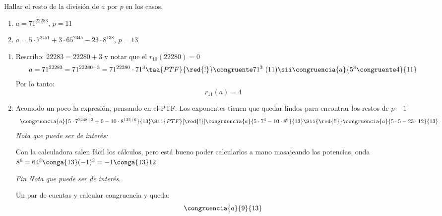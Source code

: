 \begin{enunciado}{\ejercicio}
  Hallar el resto de la división de $a$ por $p$ en los casos.
  \begin{enumerate}[label=\alph*)]
    \item $a = 71^{22283},\, p=11$
    \item $a = 5 \cdot 7^{2451} + 3 \cdot 65^{2345} - 23 \cdot 8^{138}, \, p = 13$
  \end{enumerate}
\end{enunciado}

\begin{enumerate}[label=\alph*)]
  \item
        Rescribo: $22283 = 22280 + 3$ y notar que el $r_{10}(22280) = 0$
        $$
          a = 71^{22283} =
          71^{22280 + 3} =
          71^{22280} \cdot 71^3
          \taa{PTF}{\red{!}}\congruente 71^3 \ (11) \sii \congruencia{a}{5^3 \congruente 4}{11}
        $$
        Por lo tanto:
        $$
          r_{11}(a) = 4
        $$

  \item
        Acomodo un poco la expresión, pensando en el PTF. Los exponentes tienen que quedar lindos para encontrar los restos de $p-1$
        $$
          \begin{array}{l}
            \congruencia{a}{5 \cdot 7^{2448 + 3} + 0 - 10 \cdot 8^{132 + 6}}{13}
            \Sii{PTF}[\red{!}]
            \congruencia{a}{5 \cdot 7^3 - 10 \cdot 8^6}{13}
            \Sii{\red{!!}}
            \congruencia{a}{5 \cdot 5 - 23 \cdot 12}{13}
          \end{array}
        $$
        \textit{ Nota que puede ser de interés:}\par
        Con la calculadora salen fácil los cálculos, pero está bueno poder calcularlos a mano masajeando las potencias, onda
        $8^6 = 64^3 \conga{13} (-1)^3 = -1 \conga{13} 12$\par
        \textit{ Fin Nota que puede ser de interés.}

        Un par de cuentas y calcular congruencia y queda:
        $$
          \congruencia{a}{9}{13}
        $$
\end{enumerate}

\begin{aportes}
  \item {}
\end{aportes}
